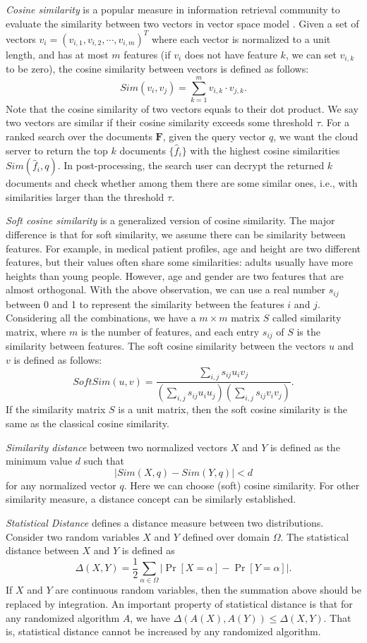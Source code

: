 \documentclass{IEEEtran}
\begin{document}
\emph{Cosine similarity} is a popular measure in information retrieval community to evaluate the similarity between two vectors in vector space model \cite{Sun13,ATY13,TAJY14}. Given a set of vectors $v_i = (v_{i,1}, v_{i,2}, \cdots, v_{i,m})^T$ where each vector is normalized to a unit length, and has at most $m$ features (if $v_i$ does not have feature $k$, we can set $v_{i,k}$ to be zero), the cosine similarity between vectors is defined as follows:
$$Sim(v_i,v_j) = \sum_{k=1}^m v_{i,k}\cdot v_{j,k}.$$
Note that the cosine similarity of two vectors equals to their dot product. We say two vectors are similar if their cosine similarity exceeds some threshold $\tau$. For a ranked search over the documents $\mathbf{F}$, given the query vector $q$, we want the cloud server to return the top $k$ documents $\{\hat{f}_i\}$ with the highest cosine similarities $Sim(\hat{f}_i, q)$. In post-processing, the search user can decrypt the returned $k$ documents and check whether among them there are some similar ones, i.e., with similarities larger than the threshold $\tau$.

\emph{Soft cosine similarity} is a generalized version of cosine similarity. The major difference is that for soft similarity, we assume there can be similarity between features. For example, in medical patient profiles, age and height are two different features, but their values often share some similarities: adults usually have more heights than young people. However, age and gender are two features that are almost orthogonal. With the above observation, we can use a real number $s_{ij}$ between 0 and 1 to represent the similarity between the features $i$ and $j$. Considering all the combinations, we have a $m \times m$ matrix $S$ called similarity matrix, where $m$ is the number of features, and each entry $s_{ij}$ of $S$ is the similarity between features. The soft cosine similarity between the vectors $u$ and $v$ is defined as follows:
$$SoftSim(u, v) = \frac{\sum_{i,j}s_{ij}u_i v_j}{(\sum_{i,j}s_{ij}u_i u_j)(\sum_{i,j}s_{ij}v_i v_j)}.$$
If the similarity matrix $S$ is a unit matrix, then the soft cosine similarity is the same as the classical cosine similarity.

\emph{Similarity distance} between two normalized vectors $X$ and $Y$ is defined as the minimum value $d$ such that 
$$|Sim(X, q) - Sim(Y, q)|<d$$ 
for any normalized vector $q$. Here we can choose (soft) cosine similarity. For other similarity measure, a distance concept can be similarly established.

\emph{Statistical Distance} \cite{AB09,G95} defines a distance measure between two distributions. Consider two random variables $X$ and $Y$ defined over domain $\Omega$. The statistical distance between $X$ and $Y$ is defined as
$$\Delta(X,Y) = \frac{1}{2}\sum_{\alpha\in\Omega} |\Pr[X=\alpha] - \Pr[Y=\alpha]|.$$
If $X$ and $Y$ are continuous random variables, then the summation above should be replaced by integration.
An important property of statistical distance is that for any randomized algorithm $A$, we have $\Delta(A(X),A(Y))\leq\Delta(X,Y)$. That is, statistical distance cannot be increased by any randomized algorithm.
\end{document}

